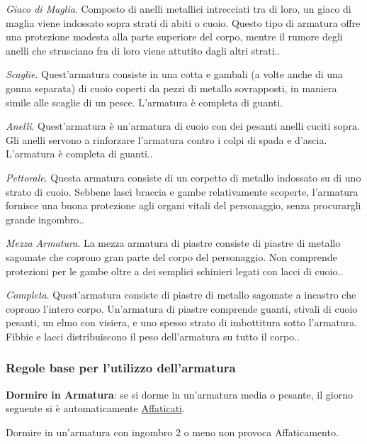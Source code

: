 \documentclass[12pt,a4paper,twoside,openany]{book}
\begin{document}
\begin{multicols}{2}
\textit{Giaco di Maglia}. Composto di anelli metallici intrecciati tra di loro, un giaco di maglia viene indossato sopra strati di abiti o cuoio. Questo tipo di armatura offre una protezione modesta alla parte superiore del corpo, mentre il rumore degli anelli che strusciano fra di loro viene attutito dagli altri strati..

\textit{Scaglie}. Quest'armatura consiste in una cotta e gambali (a volte anche di una gonna separata) di cuoio coperti da pezzi di metallo sovrapposti, in maniera simile alle scaglie di un pesce. L'armatura è completa di guanti.

\textit{Anelli}. Quest'armatura è un'armatura di cuoio con dei pesanti anelli cuciti sopra. Gli anelli servono a rinforzare l'armatura contro i colpi di spada e d'ascia. L'armatura è completa di guanti..

\textit{Pettorale}. Questa armatura consiste di un corpetto di metallo indossato su di uno strato di cuoio. Sebbene lasci braccia e gambe relativamente scoperte, l'armatura fornisce una buona protezione agli organi vitali del personaggio, senza procurargli grande ingombro..

\textit{Mezza Armatura}. La mezza armatura di piastre consiste di piastre di metallo sagomate che coprono gran parte del corpo del personaggio. Non comprende protezioni per le gambe oltre a dei semplici schinieri legati con lacci di cuoio..

\textit{Completa}. Quest'armatura consiste di piastre di metallo sagomate a incastro che coprono l'intero corpo. Un'armatura di piastre comprende guanti, stivali di cuoio pesanti, un elmo con visiera, e uno spesso strato di imbottitura sotto l'armatura. Fibbie e lacci distribuiscono il peso dell'armatura su tutto il corpo..


\subsubsection{Regole base per l'utilizzo dell'armatura}

\textbf{Dormire in Armatura}: se si dorme in un'armatura media o pesante, il giorno seguente si è automaticamente \hyperlink{affaticato}{Affaticati}.

Dormire in un'armatura con ingombro 2 o meno non provoca Affaticamento.


\end{multicols}
\end{document}
